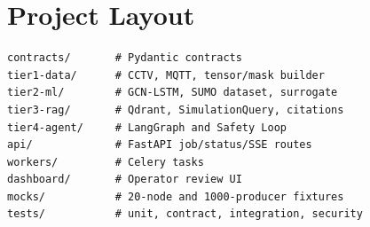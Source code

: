 \section{Project Layout}

\begin{lstlisting}
contracts/       # Pydantic contracts
tier1-data/      # CCTV, MQTT, tensor/mask builder
tier2-ml/        # GCN-LSTM, SUMO dataset, surrogate
tier3-rag/       # Qdrant, SimulationQuery, citations
tier4-agent/     # LangGraph and Safety Loop
api/             # FastAPI job/status/SSE routes
workers/         # Celery tasks
dashboard/       # Operator review UI
mocks/           # 20-node and 1000-producer fixtures
tests/           # unit, contract, integration, security
\end{lstlisting}
